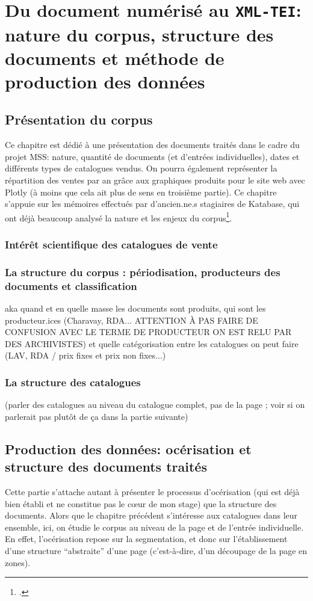 \documentclass[a4paper, 12pt, twoside]{book}
\newcommand{\xmltei}{\texttt{XML-TEI}}
\begin{document}
\part{Du document numérisé au \xmltei: nature du corpus, structure des documents et méthode de production des données}
\chapter{Présentation du corpus}
Ce chapitre est dédié à une présentation des documents traités dans le cadre du projet MSS: nature, quantité de documents (et d'entrées individuelles), dates et différents types de catalogues vendus. On pourra également représenter la répartition des ventes par an grâce aux graphiques produits pour le site web avec Plotly (à moins que cela ait plus de sens en troisième partie). Ce chapitre s'appuie sur les mémoires effectués par d'ancien.ne.s stagiaires de Katabase, qui ont déjà beaucoup analysé la nature et les enjeux du corpus\footcite{rondeau_du_noyer_encoder_2019, corbieres_du_2020, janes_du_2021}.

\section{Intérêt scientifique des catalogues de vente}

\section{La structure du corpus : périodisation, producteurs des documents et classification}
aka quand et en quelle masse les documents sont produits, qui sont les producteur.ices (Charavay, RDA... ATTENTION À PAS FAIRE DE CONFUSION AVEC LE TERME DE PRODUCTEUR ON EST RELU PAR DES ARCHIVISTES) et quelle catégorisation entre les catalogues on peut faire (LAV, RDA / prix fixes et prix non fixes...)

\section{La structure des catalogues}
(parler des catalogues au niveau du catalogue complet, pas de la page ; voir si on parlerait pas plutôt de ça dans la partie suivante)


\chapter{Production des données: océrisation et structure des documents traités}
Cette partie s'attache autant à présenter le processus d'océrisation (qui est déjà bien établi et ne constitue pas le cœur de mon stage) que la structure des documents. Alors que le chapitre précédent s'intéresse aux catalogues dans leur ensemble, ici, on étudie le corpus au niveau de la page et de l'entrée individuelle. En effet, l'océrisation repose sur la segmentation, et donc sur l'établissement d'une structure \enquote{abstraite} d'une page (c'est-à-dire, d'un découpage de la page en zones).
\end{document}
